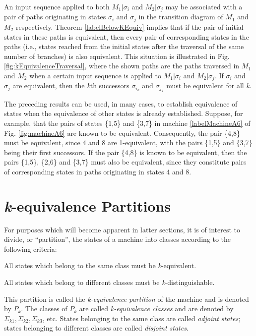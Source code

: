 \documentclass[a4paper]{report}
\begin{document}
    An input sequence applied to both $M_1|\sigma_i$ and $M_2|\sigma_j$ may be associated with a pair of paths originating in states $\sigma_i$ and $\sigma_j$ in the transition diagram of $M_1$ and $M_2$ respectively. Theorem \ref{labelBelowKEquiv} implies that if the pair of initial states in these paths is equivalent, then every pair of corresponding states in the paths (i.e., states reached from the initial states after the traversal of the same number of branches) is also equivalent. This situation is illustrated in Fig. \ref{fig:kEquivalenceTraversal}, where the shown paths are the paths traversed in $M_1$ and $M_2$ when a certain input sequence is applied to $M_1|\sigma_i$ and $M_2|\sigma_j$. If $\sigma_i$ and $\sigma_j$ are equivalent, then the \emph{k}th successors $\sigma_{i_{k}}$ and $\sigma_{j_{k}}$ must be equivalent for all \emph{k}.

    The preceding results can be used, in many cases, to establish equivalence of states when the equivalence of other states is already established. Suppose, for example, that the pairs of states \{1,5\} and \{3,7\} in machine \ref{labelMachineA6} of Fig. \ref{fig:machineA6} are known to be equivalent. Consequently, the pair \{4,8\} must be equivalent, since 4 and 8 are 1-equivalent, with the pairs \{1,5\} and \{3,7\} being their first successors. If the pair \{4,8\} is known to be equivalent, then the pairs \{1,5\}, \{2,6\} and \{3,7\} must also be equivalent, since they constitute pairs of corresponding states in paths originating in states 4 and 8.

\section{\emph{k}-equivalence Partitions}

    For purposes which will become apparent in latter sections, it is of interest to divide, or ``partition'', the states of a machine into classes according to the following criteria: \begin{inparaenum}
    \item All states which belong to the same class must be \emph{k}-equivalent.
    \item All states which belong to different classes must be \emph{k}-distinguishable.
    \end{inparaenum} This partition is called the \emph{k-equivalence partition} of the machine and is denoted by $P_k$. The classes of $P_k$ are called \emph{k-equivalence classes} and are denoted by $\Sigma_{k1},\Sigma_{k2},\Sigma_{k3}$, etc. States belonging to the same class are called \emph{adjoint states}; states belonging to different classes are called \emph{disjoint states}.
\end{document}
